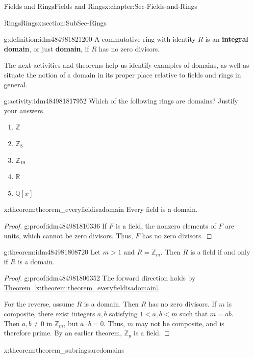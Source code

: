 \documentclass[oneside,10pt,]{book}
\newcommand{\xreffont}{\relax}
\newcommand{\terminology}[1]{\textbf{#1}}
\numberwithin{equation}{section}
\def\Z{{\mathbb Z}}
\def\Q{{\mathbb Q}}
\def\R{{\mathbb R}}
\newcommand{\lt}{<}
\begin{document}
\begin{chapterptx}{Fields and Rings}{}{Fields and Rings}{}{}{x:chapter:Sec-Fields-and-Rings}
\begin{sectionptx}{Rings}{}{Rings}{}{}{x:section:SubSec-Rings}
\begin{definition}{}{g:definition:idm484981821200}%
%
%
A commutative ring with identity \(R\) is an \terminology{integral domain}, or just \terminology{domain}, if \(R\) has no zero divisors.%
\end{definition}
The next activities and theorems help us identify examples of domains, as well as situate the notion of a domain in its proper place relative to fields and rings in general.%
\begin{activity}{}{g:activity:idm484981817952}%
Which of the following rings are domains? Justify your answers.%
\begin{enumerate}
\item{}\(\Z\)%
\item{}\(\Z_{8}\)%
\item{}\(\Z_{19}\)%
\item{}\(\R\)%
\item{}\(\Q[x]\)%
\end{enumerate}
%
\end{activity}
\begin{theorem}{}{}{x:theorem:theorem_everyfieldisadomain}%
Every field is a domain.%
\end{theorem}
\begin{proof}{}{g:proof:idm484981810336}
If \(F\) is a field, the nonzero elements of \(F\) are units, which cannot be zero divisors. Thus, \(F\) has no zero divisors.%
\end{proof}
\begin{theorem}{}{}{g:theorem:idm484981808720}%
Let \(m > 1\) and \(R = \Z_m\). Then \(R\) is a field if and only if \(R\) is a domain.%
\end{theorem}
\begin{proof}{}{g:proof:idm484981806352}
The forward direction holds by \hyperref[x:theorem:theorem_everyfieldisadomain]{Theorem~{\xreffont\ref{x:theorem:theorem_everyfieldisadomain}}}.%
\par
For the reverse, assume \(R\) is a domain. Then \(R\) has no zero divisors. If \(m\) is composite, there exist integers \(a,b\) satisfying \(1 \lt a,b \lt m\) such that \(m=ab\). Then \(\overline{a},\overline{b}\ne \overline{0}\) in \(\Z_m\), but \(\overline{a}\cdot \overline{b} = \overline{0}\). Thus, \(m\) may not be composite, and is therefore prime. By an earlier theorem, \(\Z_p\) is a field.%
\end{proof}
\begin{theorem}{}{}{x:theorem:theorem_subringsaredomains}%

\end{theorem}
\end{sectionptx}
\end{chapterptx}
\end{document}
